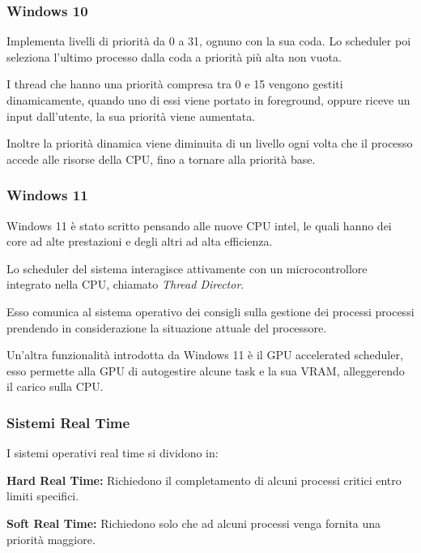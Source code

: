 \subsubsection{Windows 10}
Implementa livelli di priorità da 0 a 31, ognuno con la sua coda. Lo scheduler poi seleziona l'ultimo processo dalla coda a priorità più alta non vuota.

\spacer
I thread che hanno una priorità compresa tra 0 e 15 vengono gestiti dinamicamente, quando uno di essi viene portato in foreground, oppure riceve un input dall'utente, la sua priorità viene aumentata.

Inoltre la priorità dinamica viene diminuita di un livello ogni volta che il processo accede alle risorse della CPU, fino a tornare alla priorità base.

\subsubsection{Windows 11}
Windows 11 è stato scritto pensando alle nuove CPU intel, le quali hanno dei core ad alte prestazioni e degli altri ad alta efficienza.

Lo scheduler del sistema interagisce attivamente con un microcontrollore integrato nella CPU, chiamato \textit{Thread Director}.

Esso comunica al sistema operativo dei consigli sulla gestione dei processi processi prendendo in considerazione la situazione attuale del processore.

\spacer
Un'altra funzionalità introdotta da Windows 11 è il GPU accelerated scheduler, esso permette alla GPU di autogestire alcune task e la sua VRAM, alleggerendo il carico sulla CPU.

\subsubsection{Sistemi Real Time}
I sistemi operativi real time si dividono in:
\begin{sitemize}
    \item \textbf{Hard Real Time:} Richiedono il completamento di alcuni processi critici entro limiti specifici.
    \item \textbf{Soft Real Time:} Richiedono solo che ad alcuni processi venga fornita una priorità maggiore.
\end{sitemize}
